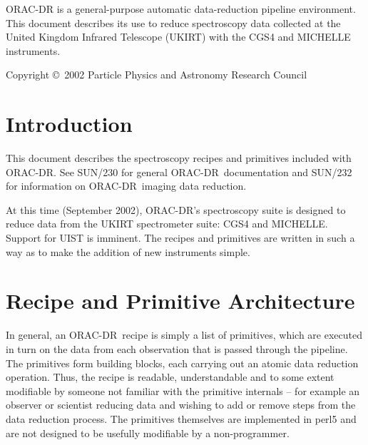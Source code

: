 \documentclass[twoside,11pt]{article}
\newcommand{\stardocinitials}  {SUN}
\newcommand{\stardoccopyright} {Copyright \copyright\ 2002 Particle Physics and Astronomy Research Council}
\newcommand{\stardocnumber}    {236.2}
\newcommand{\stardocabstract}  {ORAC-DR is a
general-purpose automatic data-reduction pipeline environment.  This
document describes its use to reduce spectroscopy data collected at the
United Kingdom Infrared Telescope (UKIRT) with the CGS4 and MICHELLE
instruments. }
\newcommand{\stardocname}{\stardocinitials /\stardocnumber}
\newenvironment{latexonly}{}{}
\newcommand{\xref}[3]{#1}
\renewcommand{\_}{\texttt{\symbol{95}}}
\newcommand{\ORACDR}{{\footnotesize ORAC-DR}}
\renewcommand{\thepage}{\roman{page}}
\begin{document}
\stardocabstract

\begin{latexonly}
\newpage
\vspace*{\fill}
\stardoccopyright
\end{latexonly}

  \newpage
  \begin{latexonly}
    \setlength{\parskip}{0mm}
    \tableofcontents
    \setlength{\parskip}{\medskipamount}
    \markboth{\stardocname}{\stardocname}
  \end{latexonly}

\cleardoublepage
\renewcommand{\thepage}{\arabic{page}}
\setcounter{page}{1}


\section{Introduction}

This document describes the spectroscopy recipes and primitives included with
\ORACDR. See \xref{SUN/230}{sun230}{} for general \ORACDR\ documentation and
\xref{SUN/232}{sun232}{} for information on \ORACDR\ imaging data reduction.

At this time (September 2002), \ORACDR's spectroscopy suite is designed
to reduce data from the UKIRT spectrometer suite: CGS4 and
MICHELLE. Support for UIST is imminent. The recipes and primitives
are written in such a way as to make the addition of new instruments
simple.

\section{Recipe and Primitive Architecture}

In general, an \ORACDR\ recipe is simply a list of primitives, which
are executed in turn on the data from each observation that is passed
through the pipeline. The primitives form building blocks, each
carrying out an atomic data reduction operation. Thus, the recipe is
readable, understandable and to some extent modifiable by someone not
familiar with the primitive internals -- for example an observer or
scientist reducing data and wishing to add or remove steps from the
data reduction process. The primitives themselves are implemented in
perl5 and are not designed to be usefully modifiable by a
non-programmer.
\end{document}
